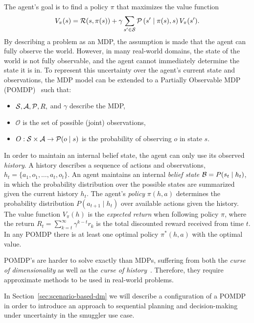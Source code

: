 \documentclass[conference]{IEEEtran}
\begin{document}
The agent's goal is to find a policy $\pi$ that maximizes the value function
\begin{equation}
V_{\pi}(s) = \R(s,\pi(s)) + \gamma\sum\limits_{s^\prime\in\S}\P\left(s'\mid\pi(s),s\right)V_{\pi}(s^\prime).
\end{equation} 
By describing a problem as an MDP, the assumption is made that the agent can fully observe the world. However, in many real-world domains, the state of the world is not fully observable, and the agent cannot immediately determine the state it is in. To represent this uncertainty over the agent's current state and observations, the MDP model can be extended to a Partially Observable MDP (POMDP)~\cite{aastrom1965optimal,pomdp} such that: 

\begin{itemize}
\item $\S,\mathcal{A},\P,R,$ and $\gamma$ describe the MDP,
\item $\mathcal{O}$ is the set of possible (joint) observations,
\item $O:\S\times\mathcal{A}\to\P(o\mid s)$ is the probability of observing $o$ in state $s$. 
\end{itemize}

In order to maintain an internal belief state, the agent can only use its observed \emph{history}. A history describes a sequence of actions and observations, $h_t = \{a_1, o_1, \ldots, a_t, o_t\}$. An agent maintains an internal {\it belief state} $\B = P(s_t\mid  h_t)$, in which the probability distribution over the possible states are summarized given the current history $h_t$. The agent's \emph{policy} $\pi(h,a)$ determines the probability distribution $P(a_{t+1}\mid h_t)$ over available actions given the history. The value function $V_{\pi}(h)$ is the {\it expected return} when following policy $\pi$, where the return $R_t = \sum\nolimits_{k=t}^{\infty} \gamma^{k−t}r_k$ is the total discounted reward received from time $t$. In any POMDP there is at least one optimal policy $\pi^*(h, a)$ with the optimal value.

POMDP's are harder to solve exactly than MDPs, suffering from both the {\it curse of dimensionality} as well as the {\it curse of history}~\cite{pineau2006anytime}. Therefore, they require approximate methods to be used in real-world problems.

In Section~\ref{sec:scenario-based-dm} we will describe a configuration of a POMDP in order to introduce an approach to sequential planning and decision-making under uncertainty in the smuggler use case. 
\end{document}
